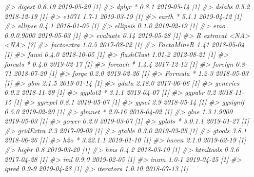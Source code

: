\documentclass[]{krantz}
\makeatletter
\newenvironment{Shaded}{\begin{snugshade}}{\end{snugshade}}
\newcommand{\CommentTok}[1]{\textcolor[rgb]{0.37,0.37,0.37}{\textit{#1}}}
\newenvironment{kframe}{%
\medskip{}
\setlength{\fboxsep}{.8em}
 \def\at@end@of@kframe{}%
 \ifinner\ifhmode%
  \def\at@end@of@kframe{\end{minipage}}%
  \begin{minipage}{\columnwidth}%
 \fi\fi%
 \def\FrameCommand##1{\hskip\@totalleftmargin \hskip-\fboxsep
 \colorbox{shadecolor}{##1}\hskip-\fboxsep
     \hskip-\linewidth \hskip-\@totalleftmargin \hskip\columnwidth}%
 \MakeFramed {\advance\hsize-\width
   \@totalleftmargin\z@ \linewidth\hsize
   \@setminipage}}%
 {\par\unskip\endMakeFramed%
 \at@end@of@kframe}
\renewenvironment{Shaded}{\begin{kframe}}{\end{kframe}}
\makeatother
\begin{document}
\begin{Shaded}
\begin{Highlighting}[]
\CommentTok{#>    digest          0.6.19     2019-05-20 [1]}
\CommentTok{#>    dplyr         * 0.8.1      2019-05-14 [1]}
\CommentTok{#>    dslabs          0.5.2      2018-12-19 [1]}
\CommentTok{#>    e1071           1.7-1      2019-03-19 [1]}
\CommentTok{#>    earth         * 5.1.1      2019-04-12 [1]}
\CommentTok{#>    ellipse         0.4.1      2018-01-05 [1]}
\CommentTok{#>    ellipsis        0.1.0      2019-02-19 [1]}
\CommentTok{#>    emo             0.0.0.9000 2019-05-03 [1]}
\CommentTok{#>    evaluate        0.14       2019-05-28 [1]}
\CommentTok{#>  R extracat        <NA>       <NA>       [?]}
\CommentTok{#>    factoextra      1.0.5      2017-08-22 [1]}
\CommentTok{#>    FactoMineR      1.41       2018-05-04 [1]}
\CommentTok{#>    fansi           0.4.0      2018-10-05 [1]}
\CommentTok{#>    flashClust      1.01-2     2012-08-21 [1]}
\CommentTok{#>    forcats       * 0.4.0      2019-02-17 [1]}
\CommentTok{#>    foreach       * 1.4.4      2017-12-12 [1]}
\CommentTok{#>    foreign         0.8-71     2018-07-20 [1]}
\CommentTok{#>    forge           0.2.0      2019-02-26 [1]}
\CommentTok{#>    Formula       * 1.2-3      2018-05-03 [1]}
\CommentTok{#>    gbm             2.1.5      2019-01-14 [1]}
\CommentTok{#>    gdata           2.18.0     2017-06-06 [1]}
\CommentTok{#>    generics        0.0.2      2018-11-29 [1]}
\CommentTok{#>    ggplot2       * 3.1.1      2019-04-07 [1]}
\CommentTok{#>    ggpubr          0.2        2018-11-15 [1]}
\CommentTok{#>    ggrepel         0.8.1      2019-05-07 [1]}
\CommentTok{#>    ggsci           2.9        2018-05-14 [1]}
\CommentTok{#>    ggsignif        0.5.0      2019-02-20 [1]}
\CommentTok{#>    glmnet        * 2.0-16     2018-04-02 [1]}
\CommentTok{#>    glue            1.3.1.9000 2019-05-03 [1]}
\CommentTok{#>    gower           0.2.0      2019-03-07 [1]}
\CommentTok{#>    gplots        * 3.0.1.1    2019-01-27 [1]}
\CommentTok{#>    gridExtra       2.3        2017-09-09 [1]}
\CommentTok{#>    gtable          0.3.0      2019-03-25 [1]}
\CommentTok{#>    gtools          3.8.1      2018-06-26 [1]}
\CommentTok{#>    h2o           * 3.22.1.1   2019-01-10 [1]}
\CommentTok{#>    haven           2.1.0      2019-02-19 [1]}
\CommentTok{#>    highr           0.8        2019-03-20 [1]}
\CommentTok{#>    hms             0.4.2      2018-03-10 [1]}
\CommentTok{#>    htmltools       0.3.6      2017-04-28 [1]}
\CommentTok{#>    iml             0.9.0      2019-02-05 [1]}
\CommentTok{#>    inum            1.0-1      2019-04-25 [1]}
\CommentTok{#>    ipred           0.9-9      2019-04-28 [1]}
\CommentTok{#>    iterators       1.0.10     2018-07-13 [1]}

\end{Highlighting}
\end{Shaded}
\end{document}
